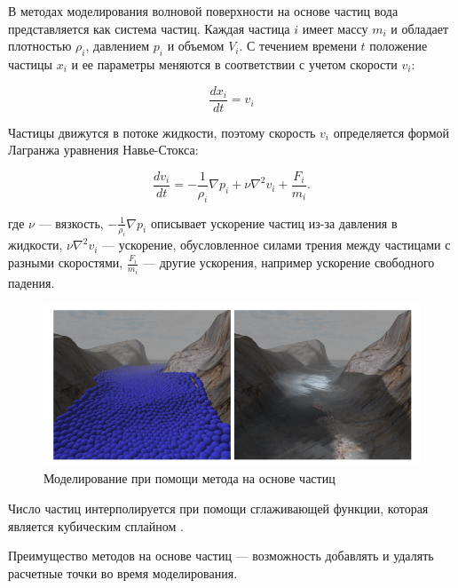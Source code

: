В методах моделирования волновой поверхности на основе частиц \cite{sph} вода представляется как система частиц. Каждая частица $i$ имеет массу $m_{i}$ и обладает плотностью $\rho _{i}$, давлением $p_{i}$ и объемом $V_{i}$. С течением времени $t$ положение частицы $x_{i}$ и ее параметры меняются в соответствии с учетом скорости $v_{i}$:

\begin{equation}
    \label{vi}
    \frac{dx_{i}}{dt} = v_{i}
\end{equation}

Частицы движутся в потоке жидкости, поэтому скорость $v_{i}$ определяется формой Лагранжа уравнения Навье-Стокса:

\begin{equation}
    \label{dv}
    \frac{dv_{i}}{dt} = -\frac{1}{\rho _{i}} \nabla p_{i} + \nu \nabla ^2 v_{i} + \frac{F_{i}}{m_{i}}.
\end{equation}

где $\nu$ --- вязкость, $-\frac{1}{\rho _{i}} \nabla p_{i}$ описывает ускорение частиц из-за давления в жидкости, $\nu \nabla ^2 v_{i}$ --- ускорение, обусловленное силами трения между частицами с разными скоростями, $\frac{F_{i}}{m_{i}}$ --- другие ускорения, например ускорение свободного падения.

\begin{figure}[H]
	\begin{center}
		\includegraphics[scale=0.5]{img/particle.png}
	\end{center}
	\captionsetup{justification=centering}
	\caption{Моделирование при помощи метода на основе частиц}
	\label{img:particle}
\end{figure}

Число частиц интерполируется при помощи сглаживающей функции, которая является кубическим сплайном \cite{mps}.

Преимущество методов на основе частиц --- возможность добавлять и удалять расчетные точки во время моделирования.

